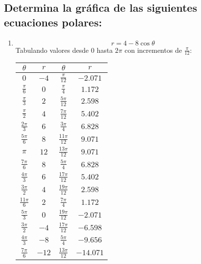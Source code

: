 \begin{multicols}{2}
  \section{Determina la gráfica de las siguientes ecuaciones polares:}
  \begin{enumerate}
    \item \[
      r = 4-8\cos{\theta}
    \]
    Tabulando valores desde \( 0 \) hasta \( 2\pi \) con incrementos de \( \frac{\pi}{12} \):
    \begin{center}
      \begin{tabular}{|c|c||c|c|}
        \hline
        \( \theta \) & \( r \) & \( \theta \) & \( r \) \\
        \hline
        \( 0 \) & \( -4 \) & \( \frac{\pi}{12} \) & \( -2.071 \) \\
        \( \frac{\pi}{6} \) & \( 0 \) & \( \frac{\pi}{4} \) & \( 1.172 \) \\
        \( \frac{\pi}{3} \) & \( 2 \) & \( \frac{5\pi}{12} \) & \( 2.598 \) \\
        \( \frac{\pi}{2} \) & \( 4 \) & \( \frac{7\pi}{12} \) & \( 5.402 \) \\
        \( \frac{2\pi}{3} \) & \( 6 \) & \( \frac{3\pi}{4} \) & \( 6.828 \) \\
        \( \frac{5\pi}{6} \) & \( 8 \) & \( \frac{11\pi}{12} \) & \( 9.071 \) \\
        \( \pi \) & \( 12 \) & \( \frac{13\pi}{12} \) & \( 9.071 \) \\
        \( \frac{7\pi}{6} \) & \( 8 \) & \( \frac{5\pi}{4} \) & \( 6.828 \) \\
        \( \frac{4\pi}{3} \) & \( 6 \) & \( \frac{17\pi}{12} \) & \( 5.402 \) \\
        \( \frac{3\pi}{2} \) & \( 4 \) & \( \frac{19\pi}{12} \) & \( 2.598 \) \\
        \( \frac{11\pi}{6} \) & \( 2 \) & \( \frac{7\pi}{4} \) & \( 1.172 \) \\
        \( \frac{5\pi}{3} \) & \( 0 \) & \( \frac{19\pi}{12} \) & \( -2.071 \) \\
        \( \frac{3\pi}{2} \) & \( -4 \) & \( \frac{17\pi}{12} \) & \( -6.598 \) \\
        \( \frac{4\pi}{3} \) & \( -8 \) & \( \frac{5\pi}{4} \) & \( -9.656 \) \\
        \( \frac{7\pi}{6} \) & \( -12 \) & \( \frac{13\pi}{12} \) & \( -14.071 \) \\
        \hline
      \end{tabular}
    \end{center}

\end{enumerate}
\end{multicols}
